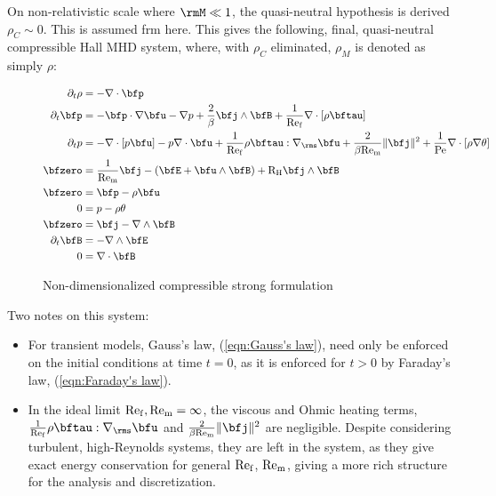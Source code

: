     On non-relativistic scale where $\rmM  \ll  1$, the quasi-neutral hypothesis is derived $\rho_{C}  \sim  0$. This is assumed frm here. This gives the following, final, quasi-neutral compressible Hall MHD system, where, with $\rho_{C}$ eliminated, $\rho_{M}$ is denoted as simply $\rho$:

    \begin{figure}[!ht]
        \centering
        \line
        \begin{align}
            \partial_{t}\rho  &=  - \nabla\cdot\bfp  \label{eqn:mass conservation}  \\
            \partial_{t}\bfp  &=  - \bfp\cdot\nabla\bfu - \nabla p + \frac{2}{\beta}\bfj\wedge\bfB + \frac{1}{\rmRef}\nabla\cdot[\rho\bftau]  \label{eqn:momentum conservation}  \\
            \partial_{t}p  &=  - \nabla\cdot[p\bfu] - p\nabla\cdot\bfu + \frac{1}{\rmRef}\rho\bftau:\nabla_{\rms}\bfu + \frac{2}{\beta\rmRem}\|\bfj\|^{2} + \frac{1}{\rmPe}\nabla\cdot[\rho\nabla\theta]  \label{eqn:energy conservation}  \\
            \bfzero  &=  \frac{1}{\rmRem}\bfj - \left(\bfE + \bfu\wedge\bfB\right) + \rmRH\bfj\wedge\bfB  \label{eqn:current identity}  \\
            \bfzero  &=  \bfp - \rho\bfu  \label{eqn:velocity identity}  \\
            0  &=  p - \rho\theta  \label{eqn:temperature identity}  \\
            \bfzero  &=  \bfj - \nabla\wedge\bfB  \label{eqn:Ampère's law}  \\
            \partial_{t}\bfB  &=  - \nabla\wedge\bfE  \label{eqn:Faraday's law}  \\
            0  &=  \nabla\cdot\bfB  \label{eqn:Gauss's law}
        \end{align}
        \line
        \caption{Non-dimensionalized compressible strong formulation}
        \label{fig:non-dim compressible strong form}
    \end{figure}

    Two notes on this system:
    \begin{itemize}
        \item  For transient models, Gauss's law, (\ref{eqn:Gauss's law}), need only be enforced on the initial conditions at time $t  =  0$, as it is enforced for $t  >  0$ by Faraday's law, (\ref{eqn:Faraday's law}).

        \item  In the ideal limit $\mathrm{Re}_{\mathrm{f}}, \mathrm{Re}_{\mathrm{m}}  =  \infty$, the viscous and Ohmic heating terms, $\frac{1}{\rmRef}\rho\bftau:\nabla_{\rms}\bfu$ and $\frac{2}{\beta\rmRem}\|\bfj\|^{2}$ are negligible. Despite considering turbulent, high-Reynolds systems, they are left in the system, as they give exact energy conservation for general $\mathrm{Re}_{\mathrm{f}}$, $\mathrm{Re}_{\mathrm{m}}$, giving a more rich structure for the analysis and discretization. 
    \end{itemize}

